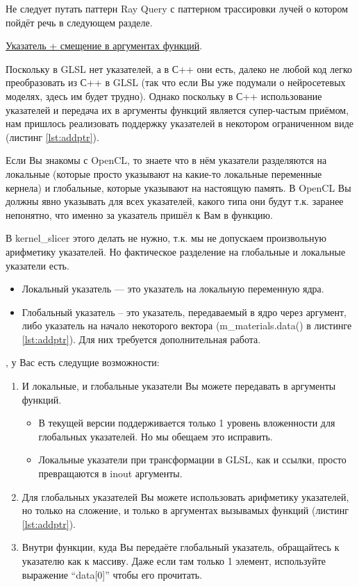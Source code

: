 \documentclass[11pt,fleqn,english,russian]{report} %
\begin{document}
\begin{remark}
Не следует путать паттерн Ray Query с паттерном трассировки лучей о котором пойдёт речь в следующем разделе. 
\end{remark}

\noindent\underline{Указатель + смещение в аргументах функций}.

Поскольку в GLSL нет указателей, а в С++ они есть, далеко не любой код легко преобразовать из С++ в GLSL (так что если Вы уже подумали о нейросетевых моделях, здесь им будет трудно). Однако поскольку в С++ использование указателей и передача их в аргументы функций является супер-частым приёмом, нам пришлось реализовать поддержку указателей в некотором ограниченном виде (листинг \ref{lst:addptr}). 

Если Вы знакомы с OpenCL, то знаете что в нём указатели разделяются на локальные (которые просто указывают на какие-то локальные переменные кернела) и глобальные, которые указывают на настоящую память. В OpenCL Вы должны явно указывать для всех указателей, какого типа они будут т.к. заранее непонятно, что именно за указатель пришёл к Вам в функцию. 

В kernel\_slicer этого делать не нужно, т.к. мы не допускаем произвольную арифметику указателей. Но фактическое разделение на глобальные и локальные указатели есть.

\begin{itemize}
\item Локальный указатель  --- это указатель на локальную переменную ядра.  
\item Глобальный указатель -- это указатель, передаваемый в ядро через аргумент, либо указатель на начало некоторого вектора (m\_materials.data() в листинге \ref{lst:addptr}). Для них требуется дополнительная работа.
\end{itemize}

, у Вас есть следущие возможности:

\begin{enumerate}
\item И локальные, и глобальные указатели Вы можете передавать в аргументы функций. 
\begin{itemize}
\item В текущей версии поддерживается только 1 уровень вложенности для глобальных указателей. Но мы обещаем это исправить.
\item Локальные указатели при трансформации в GLSL, как и ссылки, просто превращаются в inout аргументы.
\end{itemize}	
\item Для глобальных указателей Вы можете использовать арифметику указателей, но только на сложение, и только в аргументах вызывамых функций (листинг \ref{lst:addptr}).
\item Внутри функции, куда Вы передаёте глобальный указатель, обращайтесь к указателю как к массиву. Даже если там только 1 элемент, используйте выражение ``data[0]'' чтобы его прочитать. 
\end{enumerate}
\end{document}

